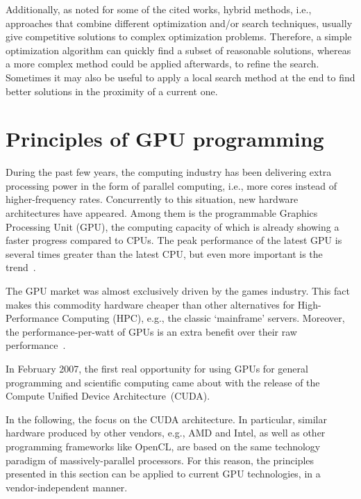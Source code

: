 Additionally, as noted for some of the cited works, hybrid methods,
i.e., approaches that combine different optimization and/or search
techniques, usually give competitive solutions to complex optimization
problems. Therefore, a simple optimization algorithm can quickly find
a subset of reasonable solutions, whereas a more complex method could
be applied afterwards, to refine the search. Sometimes it may also
be useful to apply a local search method at the end to find better
solutions in the proximity of a current one.


\chapter{Principles of GPU programming \label{chap:02-Principles_of_GPU_programming}}

During the past few years, the computing industry has been delivering
extra processing power in the form of parallel computing, i.e., more
cores instead of higher-frequency rates. Concurrently to this situation,
new hardware architectures have appeared. Among them is the programmable
Graphics Processing Unit (GPU),
the computing capacity of which is already showing a faster progress
compared to CPUs. The peak performance of the latest GPU is several
times greater than the latest CPU, but even more important is the
trend~\cite{Cruz-How_to_obtain_efficient_GPU_kernels:2011}.

The GPU market was almost exclusively driven by the games industry.
This fact makes this commodity hardware cheaper than other alternatives
for High-Performance Computing (HPC),
e.g., the classic \textquoteleft{}mainframe\textquoteright{} servers.
Moreover, the performance-per-watt of GPUs is an extra benefit over
their raw performance~\cite{Cruz-How_to_obtain_efficient_GPU_kernels:2011}.

In February 2007, the first real opportunity for using GPUs for general
programming and scientific computing came about with the release of
the Compute Unified Device Architecture~(CUDA).

In the following, the focus on the CUDA architecture. In particular,
similar hardware produced by other vendors, e.g., AMD and Intel, as
well as other programming frameworks like OpenCL, are based on the
same technology paradigm of massively-parallel processors. For this
reason, the principles presented in this section can be applied to
current GPU technologies, in a vendor-independent manner.



